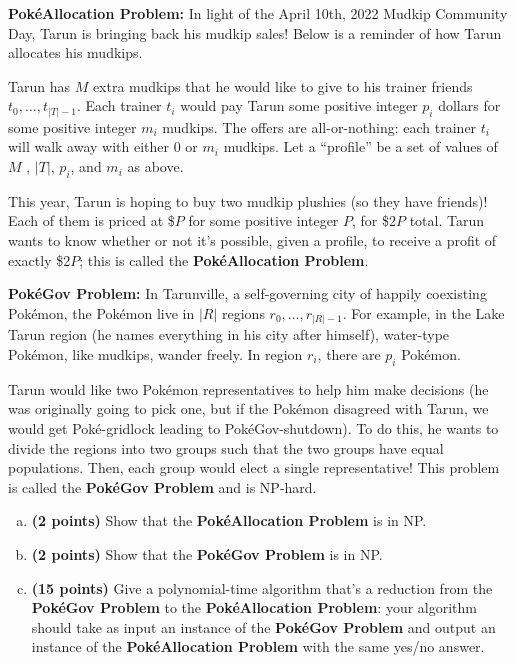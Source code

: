 \documentclass[11pt,letterpaper]{article}
\begin{document}
\pagebreak
\begin{problem}
    {\bf Pok\'{e}Allocation Problem:} In light of the April 10th, 2022 Mudkip Community Day, Tarun is bringing back his mudkip sales! Below is a reminder of how Tarun allocates his mudkips.

    \medskip
    \begin{solution}
        Tarun has $M$ extra mudkips that he would like to give to his trainer friends ${t_0,\ldots , t_{|T |-1}}$. Each trainer $t_i$ would pay Tarun some positive integer $p_i$ dollars for some positive integer $m_i$ mudkips. The offers are all-or-nothing: each trainer $t_i$ will walk away with either 0 or $m_i$ mudkips. Let a ``profile'' be a set of values of $M$ , $|T|$, $p_i$, and $m_i$ as above.
    \end{solution}
    \medskip

    This year, Tarun is hoping to buy two mudkip plushies (so they have friends)! Each of them is priced at \$$P$ for some positive integer $P$, for \$2$P$ total. Tarun wants to know whether or not it's possible, given a profile, to receive a profit of exactly \$2$P$; this is called the {\bf Pok\'{e}Allocation Problem}.

    \medskip
    {\bf Pok\'{e}Gov Problem:} In Tarunville, a self-governing city of happily coexisting Pok\'{e}mon, the Pok\'{e}mon live in $|R|$ regions ${r_0,\ldots , r_{|R|-1}}$. For example, in the Lake Tarun region (he names everything in his city after himself), water-type Pok\'{e}mon, like mudkips, wander freely. In region $r_i$, there are $p_i$ Pok\'{e}mon.

    Tarun would like two Pok\'{e}mon representatives to help him make decisions (he was originally going to pick one, but if the Pok\'{e}mon disagreed with Tarun, we would get Pok\'{e}-gridlock leading to Pok\'{e}Gov-shutdown). To do this, he wants to divide the regions into two groups such that the two groups have equal populations. Then, each group would elect a single representative! This problem is called the {\bf Pok\'{e}Gov Problem} and is NP-hard.

    \begin{enumerate}[(a)]
        \item {\bf (2 points)} Show that the {\bf Pok\'{e}Allocation Problem} is in NP.
        \item {\bf (2 points)} Show that the {\bf Pok\'{e}Gov Problem} is in NP.
        \item {\bf (15 points)} Give a polynomial-time algorithm that's a reduction from the {\bf Pok\'{e}Gov Problem} to the {\bf Pok\'{e}Allocation Problem}: your algorithm should take as input an instance of the {\bf Pok\'{e}Gov Problem} and output an instance of the {\bf Pok\'{e}Allocation Problem} with the same yes/no answer.
\end{enumerate}
\end{problem}
\end{document}
